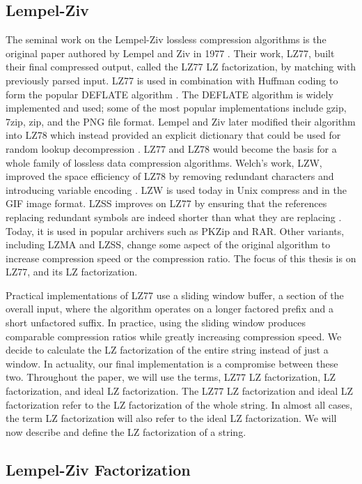 \subsection{Lempel-Ziv}

The seminal work on the Lempel-Ziv lossless compression algorithms is the original paper authored by Lempel and Ziv in 1977 \cite{Ziv77auniversal}. 
Their work, LZ77, built their final compressed output, called the LZ77 LZ factorization, by matching with previously parsed input.
LZ77 is used in combination with Huffman coding to form the popular DEFLATE algorithm \cite{deutsch1996deflate}.
The DEFLATE algorithm is widely implemented and used; some of the most popular implementations include gzip, 7zip, zip, and the PNG file format.
Lempel and Ziv later modified their algorithm into LZ78 which instead provided an explicit dictionary that could be used for random lookup decompression \cite{ziv1978compression}.
LZ77 and LZ78 would become the basis for a whole family of lossless data compression algorithms.
Welch's work, LZW, improved the space efficiency of LZ78 by removing redundant characters and introducing variable encoding \cite{welch1984technique}.
LZW is used today in Unix compress and in the GIF image format.
LZSS improves on LZ77 by ensuring that the references replacing redundant symbols are indeed shorter than what they are replacing \cite{lzss}.
Today, it is used in popular archivers such as PKZip and RAR.
Other variants, including LZMA and LZSS, change some aspect of the original algorithm to increase compression speed or the compression ratio.
The focus of this thesis is on LZ77, and its LZ factorization.

Practical implementations of LZ77 use a sliding window buffer, a section of the overall input, where the algorithm operates on a longer factored prefix and a short unfactored suffix.
In practice, using the sliding window produces comparable compression ratios while greatly increasing compression speed.
We decide to calculate the LZ factorization of the entire string instead of just a window.
In actuality, our final implementation is a compromise between these two.
Throughout the paper, we will use the terms, LZ77 LZ factorization, LZ factorization, and ideal LZ factorization.
The LZ77 LZ factorization and ideal LZ factorization refer to the LZ factorization of the whole string.
In almost all cases, the term LZ factorization will also refer to the ideal LZ factorization.
We will now describe and define the LZ factorization of a string.

\subsection{Lempel-Ziv Factorization}

